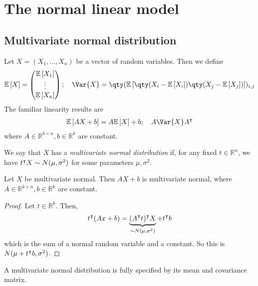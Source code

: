 \section{The normal linear model}

\subsection{Multivariate normal distribution}
Let $X = (X_1, \dots, X_n)$ be a vector of random variables.
Then we define
\begin{align*}
	\expect{X} = \begin{pmatrix}
		\expect{X_1} \\
		\vdots       \\
		\expect{X_n}
	\end{pmatrix};\quad \Var{X} = \qty( \expect{\qty(X_i - \expect{X_i})\qty(X_j - \expect{X_j})} )_{i,j}
\end{align*}
The familiar linearity results are
\begin{align*}
	\expect{AX+b} = A\expect{X} + b;\quad A \Var{X} A^\tran
\end{align*}
where $A \in \mathbb R^{k \times n}, b \in \mathbb R^k$ are constant.
\begin{definition}
	We say that $X$ has a \textit{multivariate normal distribution} if, for any fixed $t \in \mathbb R^n$, we have $t^\intercal X \sim N(\mu, \sigma^2)$ for some parameters $\mu, \sigma^2$.
\end{definition}
\begin{proposition}
	Let $X$ be multivariate normal.
	Then $AX+b$ is multivariate normal, where $A \in \mathbb R^{k \times n}, b \in \mathbb R^k$ are constant.
\end{proposition}
\begin{proof}
	Let $t \in \mathbb R^k$.
	Then,
	\begin{align*}
		t^\intercal (Ax+b) = \underbrace{(A^\intercal t)^\intercal X}_{\sim N(\mu, \sigma^2)} + t^\intercal b
	\end{align*}
	which is the sum of a normal random variable and a constant.
	So this is $N(\mu + t^\intercal b, \sigma^2)$.
\end{proof}
\begin{proposition}
	A multivariate normal distribution is fully specified by its mean and covariance matrix.
\end{proposition}

